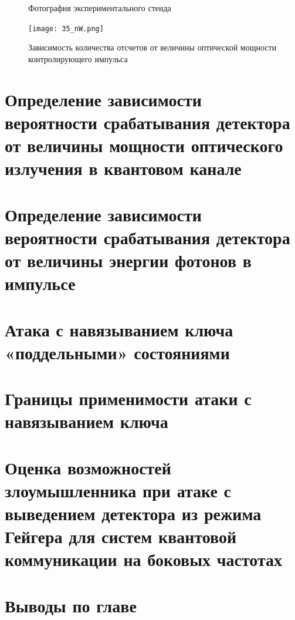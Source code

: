  \begin{figure}[ht]
  \centering
  \caption{Фотография экспериментального стенда}
  \label{fig:experimental_setup}
\end{figure}


 \begin{figure}[ht]
  \centering
  \texttt{[image: 35\_nW.png]}
  \caption{Зависимость количества отсчетов от величины оптической мощности контролирующего импульса}
  \label{fig:35_nW}
\end{figure}


\pagebreak


\section{Определение зависимости вероятности срабатывания детектора от величины мощности оптического излучения в квантовом канале} \label{sec:ch2/sec8}




\pagebreak


\section{Определение зависимости вероятности срабатывания детектора от величины энергии фотонов в импульсе} \label{sec:ch2/sec9}


\section{Атака с навязыванием ключа «поддельными» состояниями} \label{sec:ch2/sec10}


\section{Границы применимости атаки с навязыванием ключа} \label{sec:ch2/sec11}




\section{Оценка возможностей злоумышленника при атаке с выведением детектора из режима Гейгера для систем квантовой коммуникации на боковых частотах} \label{sec:ch2/sec12}



\section{Выводы по главе} \label{ch:ch2/sect13}
